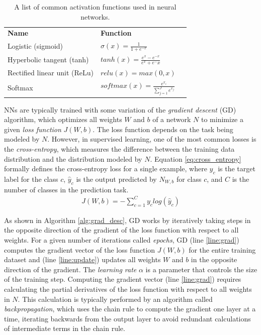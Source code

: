 \begin{table}[h]
    \centering
    \begin{tabular}{lll}
        \textbf{Name} & \textbf{Function} \\
        Logistic (sigmoid) & $\sigma(x) = \frac{1}{1 + e^{-x}}$ \\
        Hyperbolic tangent (tanh) & $tanh(x) = \frac{e^x - e^{-x}}{e^x + e^-x}$ \\
        Rectified linear unit (ReLu) & $relu(x) = max(0, x)$ \\
        Softmax & $softmax(x) = \frac{e^{x_i}}{\sum_{j=1}^{J} e^{x_j}}$ \\
    \end{tabular}
    \caption{A list of common activation functions used in neural networks.}
    \label{tab:activation}
\end{table}

NNs are typically trained with some variation of the \textit{gradient descent} (GD) algorithm, which optimizes all weights $W$ and $b$ of a network $N$ to minimize a given \textit{loss function} $J(W,b)$. The loss function depends on the task being modeled by $N$. However, in supervised learning, one of the most common losses is the \textit{cross-entropy}, which measures the difference between the training data distribution and the distribution modeled by $N$. Equation \ref{eq:cross_entropy} formally defines the cross-entropy loss for a single example, where $y_c$ is the target label for the class $c$, $\hat{y}_c$ is the output predicted by $N_{W,b}$ for class $c$, and $C$ is the number of classes in the prediction task.
\begin{equation} \label{eq:cross_entropy}
\begin{split}
    J(W,b) = -\sum_{c=1}^{C} y_clog(\hat{y}_c)
\end{split}
\end{equation}

As shown in Algorithm \ref{alg:grad_desc}, GD works by iteratively taking steps in the opposite direction of the gradient of the loss function with respect to all weights. For a given number of iterations called \textit{epochs}, GD (line \ref{line:grad}) computes the gradient vector of the loss function $J(W,b)$ for the entire training dataset and (line \ref{line:update}) updates all weights $W$ and $b$ in the opposite direction of the gradient. The \textit{learning rate} $\alpha$ is a parameter that controls the size of the training step. Computing the gradient vector (line \ref{line:grad}) requires calculating the partial derivatives of the loss function with respect to all weights in $N$. This calculation is typically performed by an algorithm called \textit{backpropagation}, which uses the chain rule to compute the gradient one layer at a time, iterating backwards from the output layer to avoid redundant calculations of intermediate terms in the chain rule.

